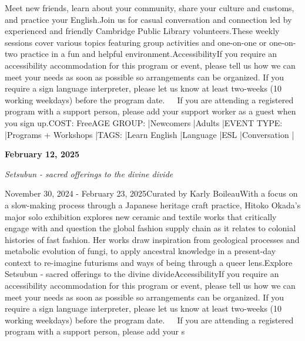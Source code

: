 \documentclass[letterpaper, 10pt]{article}
\newcommand{\headline}[1]{\textbf{\Large #1}\vspace{0.5em}}
\newcommand{\subtitle}[1]{\textit{\large #1}\vspace{0.5em}}
\newcommand{\articlecontent}[1]{\small #1\vspace{1em}}
\begin{document}
\begin{multicols}{2}
{
\vspace{10px}

Meet new friends, learn about your community, share your culture and customs, and practice your English.Join us for casual conversation and connection led by experienced and friendly Cambridge Public Library volunteers.These weekly sessions cover various topics featuring group activities and one-on-one or one-on-two practice in a fun and helpful environment.AccessibilityIf you require an accessibility accommodation for this program or event, please tell us how we can meet your needs as soon as possible so arrangements can be organized. If you require a sign language interpreter, please let us know at least two-weeks (10 working weekdays) before the program date.   If you are attending a registered program with a support person, please add your support worker as a guest when you sign up.COST: FreeAGE GROUP: |Newcomers |Adults |EVENT TYPE: |Programs + Workshops |TAGS: |Learn English |Language |ESL |Conversation |
}
\vspace{10px}

\headline{February 12, 2025}

\subtitle{Setsubun - sacred offerings to the divine divide}

\articlecontent{

\qrcode[height=1.5cm]{https://ideaexchange.libnet.info/event/11297401}
\vspace{10px}

November 30, 2024 - February 23, 2025Curated by Karly BoileauWith a focus on a slow-making process through a Japanese heritage craft practice, Hitoko Okada’s major solo exhibition explores new ceramic and textile works that critically engage with and question the global fashion supply chain as it relates to colonial histories of fast fashion. Her works draw inspiration from geological processes and metabolic evolution of fungi, to apply ancestral knowledge in a present-day context to re-imagine futurisms and ways of being through a queer lens.Explore Setsubun - sacred offerings to the divine divideAccessibilityIf you require an accessibility accommodation for this program or event, please tell us how we can meet your needs as soon as possible so arrangements can be organized. If you require a sign language interpreter, please let us know at least two-weeks (10 working weekdays) before the program date.   If you are attending a registered program with a support person, please add your s
}
\vspace{10px}


\end{multicols}
\end{document}
